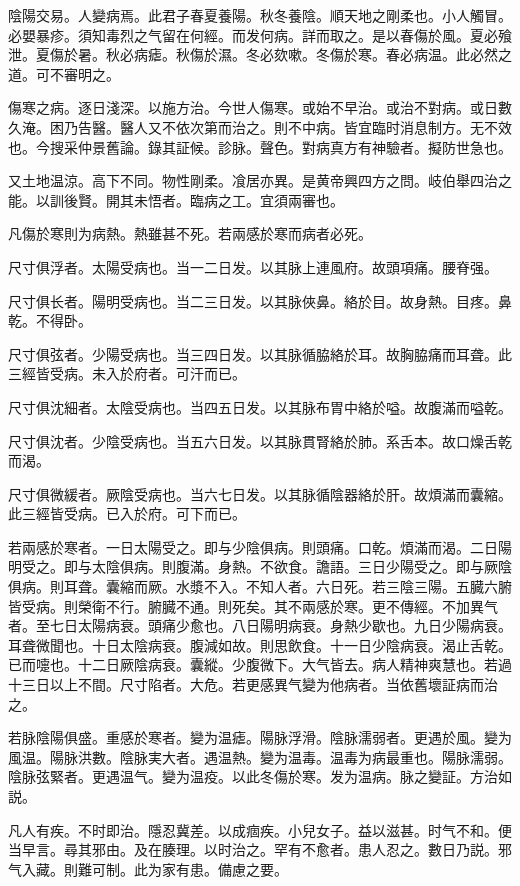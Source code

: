 陰陽交易。人變病焉。此君子春夏養陽。秋冬養陰。順天地之剛柔也。小人觸冒。必嬰暴疹。須知毒烈之气留在何經。而发何病。詳而取之。是以春傷於風。夏必飱泄。夏傷於暑。秋必病瘧。秋傷於濕。冬必欬嗽。冬傷於寒。春必病温。此必然之道。可不審明之。

傷寒之病。逐日淺深。以施方治。今世人傷寒。或始不早治。或治不對病。或日數久淹。困乃告醫。醫人又不依次第而治之。則不中病。皆宜臨时消息制方。无不效也。今搜采仲景舊論。錄其証候。診脉。聲色。對病真方有神驗者。擬防世急也。

又土地温涼。高下不同。物性剛柔。飡居亦異。是黄帝興四方之問。岐伯舉四治之能。以訓後賢。開其未悟者。臨病之工。宜須兩審也。

凡傷於寒則为病熱。熱雖甚不死。若兩感於寒而病者必死。

尺寸俱浮者。太陽受病也。当一二日发。以其脉上連風府。故頭項痛。腰脊强。

尺寸俱长者。陽明受病也。当二三日发。以其脉俠鼻。絡於目。故身熱。目疼。鼻乾。不得卧。

尺寸俱弦者。少陽受病也。当三四日发。以其脉循脇絡於耳。故胸脇痛而耳聋。此三經皆受病。未入於府者。可汗而已。

尺寸俱沈細者。太陰受病也。当四五日发。以其脉布胃中絡於嗌。故腹滿而嗌乾。

尺寸俱沈者。少陰受病也。当五六日发。以其脉貫腎絡於肺。系舌本。故口燥舌乾而渴。

尺寸俱微緩者。厥陰受病也。当六七日发。以其脉循陰器絡於肝。故煩滿而囊縮。此三經皆受病。已入於府。可下而已。

若兩感於寒者。一日太陽受之。即与少陰俱病。則頭痛。口乾。煩滿而渴。二日陽明受之。即与太陰俱病。則腹滿。身熱。不欲食。譫語。三日少陽受之。即与厥陰俱病。則耳聋。囊縮而厥。水漿不入。不知人者。六日死。若三陰三陽。五臓六腑皆受病。則榮衛不行。腑臓不通。則死矣。其不兩感於寒。更不傳經。不加異气者。至七日太陽病衰。頭痛少愈也。八日陽明病衰。身熱少歇也。九日少陽病衰。耳聋微聞也。十日太陰病衰。腹減如故。則思飲食。十一日少陰病衰。渴止舌乾。已而嚏也。十二日厥陰病衰。囊縱。少腹微下。大气皆去。病人精神爽慧也。若過十三日以上不間。尺寸陷者。大危。若更感異气變为他病者。当依舊壞証病而治之。

若脉陰陽俱盛。重感於寒者。變为温瘧。陽脉浮滑。陰脉濡弱者。更遇於風。變为風温。陽脉洪數。陰脉実大者。遇温熱。變为温毒。温毒为病最重也。陽脉濡弱。陰脉弦緊者。更遇温气。變为温疫。以此冬傷於寒。发为温病。脉之變証。方治如説。

凡人有疾。不时即治。隱忍冀差。以成痼疾。小兒女子。益以滋甚。时气不和。便当早言。尋其邪由。及在腠理。以时治之。罕有不愈者。患人忍之。數日乃説。邪气入藏。則難可制。此为家有患。備慮之要。

